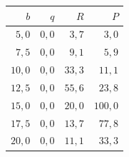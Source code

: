 
\begin{tabular}{@{}rrrr@{}}
\toprule
$b$ & $q$ & $R$ & $P$ \\
\midrule
$5{,}0$ & $0{,}0$ & $3{,}7$ & $3{,}0$ \\
$7{,}5$ & $0{,}0$ & $9{,}1$ & $5{,}9$ \\
$10{,}0$ & $0{,}0$ & $33{,}3$ & $11{,}1$ \\
$12{,}5$ & $0{,}0$ & $55{,}6$ & $23{,}8$ \\
$15{,}0$ & $0{,}0$ & $20{,}0$ & $100{,}0$ \\
$17{,}5$ & $0{,}0$ & $13{,}7$ & $77{,}8$ \\
$20{,}0$ & $0{,}0$ & $11{,}1$ & $33{,}3$ \\
\bottomrule
\end{tabular}
